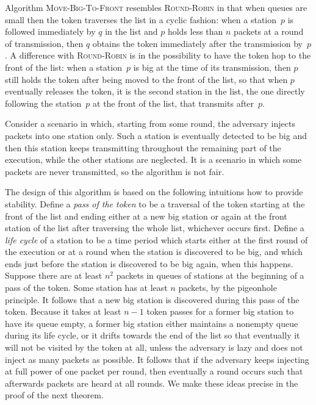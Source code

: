 \documentclass[11pt]{article}
\begin{document}
Algorithm \textsc{Move-Big-To-Front} resembles \textsc{Round-Robin} in that when queues are small then the token traverses the list in a cyclic fashion: when a station~$p$ is followed immediately by $q$ in the list and $p$ holds less than $n$ packets at a round of transmission, then $q$ obtains the token immediately after the transmission by~$p$.
A difference with \textsc{Round-Robin} is in the possibility to have the token hop to the front of the list: when a station~$p$ is big at the time of its transmission, then $p$ still holds the token after being moved to the front of the list, so that when $p$ eventually releases the token, it is the second station in the list, the one directly following the station~$p$ at the front of the list, that transmits after~$p$.

Consider a scenario in which, starting from some round, the adversary injects packets into one station only.
Such a station is eventually detected to be big and then this station keeps transmitting throughout the remaining part of the execution, while the other stations are neglected.
It is a scenario in which some packets are never transmitted, so the algorithm is not fair.

The design of this algorithm is based on the following intuitions how to provide stability.
Define a \emph{pass of the token} to be a traversal of the token starting at the front of the list and ending either at a new big station or again at the front station of the list after traversing the whole list, whichever occurs first.
Define a \emph{life cycle} of a station to be a time period which starts either at the first round of the execution or at a round when the station is discovered to be big, and which ends just before the station is discovered to be big again, when this happens.
%
Suppose there are at least $n^{2}$ packets in queues of stations at the beginning of a pass of the token.
Some station has at least $n$ packets, by the pigeonhole principle.
It follows that a new big station is discovered during this pass of the token.
Because it takes at least $n-1$ token passes for a former big station to have its queue empty, a former big station either maintains a nonempty queue during its life cycle, or it drifts towards the end of the list so that eventually it will not be visited by the token at all, unless the adversary is lazy and does not inject as many packets as possible.
It follows that if the adversary keeps injecting  at full power of one packet per round, then eventually a round occurs such that afterwards packets are heard at all rounds.
We make these ideas precise in the proof of the next theorem.
\end{document}
